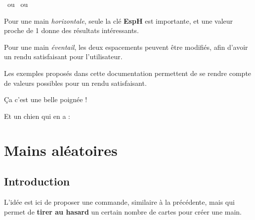 \documentclass[a4paper]{article}
\newcommand\Cle[1]{{\bfseries\sffamily\textlangle #1\textrangle}}
\begin{document}
{{{{{{{{{{{\begin{codetex}[]
~ou 
~ou 
\end{codetex}

\begin{codeinfo}
Pour une main \textit{horizontale}, seule la clé \Cle{EspH} est importante, et une valeur proche de 1 donne des résultats intéressants.

\smallskip

Pour une main \textit{éventail}, les deux espacements peuvent être modifiés, afin d'avoir un rendu satisfaisant pour l'utilisateur.

\smallskip

Les exemples proposés dans cette documentation permettent de se rendre compte de valeurs possibles pour un rendu satisfaisant.
\end{codeinfo}

\begin{codetex}[]

\smallskip


\smallskip

Ça c'est une belle poignée ! 

\smallskip

Et un chien qui en a  : 
\end{codetex}

\pagebreak

\section{Mains aléatoires}

\subsection{Introduction}

\begin{codeidee}
L'idée est ici de proposer une commande, similaire à la précédente, mais qui permet de \textbf{tirer au hasard} un certain nombre de cartes pour créer une main.
\end{codeidee}

}}}}}}}}}}}
\end{document}
